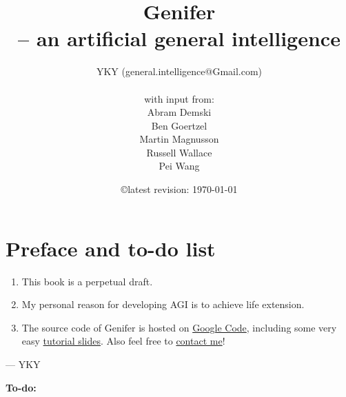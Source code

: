 \documentclass[12pt, a4paper]{report}
\title{\textbf{Genifer\\-- an artificial general intelligence}}
\author{YKY (general.intelligence@Gmail.com)\\ \\
with input from:\\
Abram Demski\\
Ben Goertzel\\
Martin Magnusson\\
Russell Wallace\\
Pei Wang
}
\date{\copyright \quad latest revision: \today}
\theoremstyle{examples} \newtheorem{example}{Example}[section]
\begin{document}
\renewcommand{\normalsize}{\fontsize{13pt}{15pt}\selectfont}
\fontsize{13pt}{15pt} \selectfont


\maketitle
\dominitoc

\setcounter{chapter}{-1}
\chapter{Preface and to-do list}

\begin{enumerate}

\item  This book is a perpetual draft.

\item  My personal reason for developing AGI is to achieve life extension.

\item  The source code of $\mbox{Genifer}$ is hosted on \href{http://code.google.com/p/genifer/}{Google Code}, including some very easy \href{http://code.google.com/p/genifer/downloads/list}{tutorial slides}.  Also feel free to \href{mailto:Generic.Intelligence@Gmail.com}{contact me}!

\end{enumerate}

\begin{flushright}
--- YKY
\end{flushright}

\color{TodoColor}

{\sffamily\bfseries\Huge To-do:}
\end{document}
